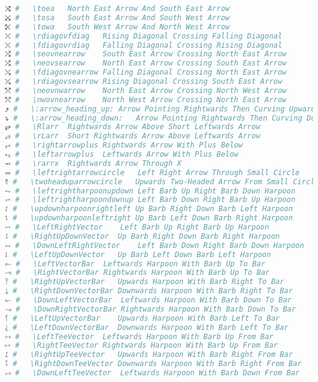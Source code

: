 \begin{lstlisting}[language=Julia, linewidth=\textwidth]
⤨ #   \toea   North East Arrow And South East Arrow
⤩ #   \tosa   South East Arrow And South West Arrow
⤪ #   \towa   South West Arrow And North West Arrow
⤫ #   \rdiagovfdiag   Rising Diagonal Crossing Falling Diagonal
⤬ #   \fdiagovrdiag   Falling Diagonal Crossing Rising Diagonal
⤭ #   \seovnearrow    South East Arrow Crossing North East Arrow
⤮ #   \neovsearrow    North East Arrow Crossing South East Arrow
⤯ #   \fdiagovnearrow Falling Diagonal Crossing North East Arrow
⤰ #   \rdiagovsearrow Rising Diagonal Crossing South East Arrow
⤱ #   \neovnwarrow    North East Arrow Crossing North West Arrow
⤲ #   \nwovnearrow    North West Arrow Crossing North East Arrow
⤴ #   \:arrow_heading_up: Arrow Pointing Rightwards Then Curving Upwards
⤵ #   \:arrow_heading_down:   Arrow Pointing Rightwards Then Curving Downwards
⥂ #   \Rlarr  Rightwards Arrow Above Short Leftwards Arrow
⥄ #   \rLarr  Short Rightwards Arrow Above Leftwards Arrow
⥅ #   \rightarrowplus Rightwards Arrow With Plus Below
⥆ #   \leftarrowplus  Leftwards Arrow With Plus Below
⥇ #   \rarrx  Rightwards Arrow Through X
⥈ #   \leftrightarrowcircle   Left Right Arrow Through Small Circle
⥉ #   \twoheaduparrowcircle   Upwards Two-Headed Arrow From Small Circle
⥊ #   \leftrightharpoonupdown Left Barb Up Right Barb Down Harpoon
⥋ #   \leftrightharpoondownup Left Barb Down Right Barb Up Harpoon
⥌ #   \updownharpoonrightleft Up Barb Right Down Barb Left Harpoon
⥍ #   \updownharpoonleftright Up Barb Left Down Barb Right Harpoon
⥎ #   \LeftRightVector    Left Barb Up Right Barb Up Harpoon
⥏ #   \RightUpDownVector  Up Barb Right Down Barb Right Harpoon
⥐ #   \DownLeftRightVector    Left Barb Down Right Barb Down Harpoon
⥑ #   \LeftUpDownVector   Up Barb Left Down Barb Left Harpoon
⥒ #   \LeftVectorBar  Leftwards Harpoon With Barb Up To Bar
⥓ #   \RightVectorBar Rightwards Harpoon With Barb Up To Bar
⥔ #   \RightUpVectorBar   Upwards Harpoon With Barb Right To Bar
⥕ #   \RightDownVectorBar Downwards Harpoon With Barb Right To Bar
⥖ #   \DownLeftVectorBar  Leftwards Harpoon With Barb Down To Bar
⥗ #   \DownRightVectorBar Rightwards Harpoon With Barb Down To Bar
⥘ #   \LeftUpVectorBar    Upwards Harpoon With Barb Left To Bar
⥙ #   \LeftDownVectorBar  Downwards Harpoon With Barb Left To Bar
⥚ #   \LeftTeeVector  Leftwards Harpoon With Barb Up From Bar
⥛ #   \RightTeeVector Rightwards Harpoon With Barb Up From Bar
⥜ #   \RightUpTeeVector   Upwards Harpoon With Barb Right From Bar
⥝ #   \RightDownTeeVector Downwards Harpoon With Barb Right From Bar
⥞ #   \DownLeftTeeVector  Leftwards Harpoon With Barb Down From Bar

\end{lstlisting}
